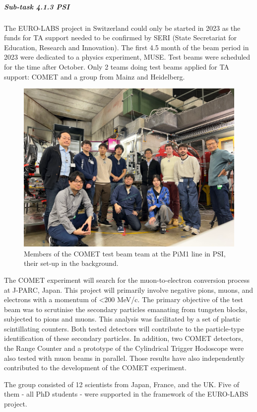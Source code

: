 \subparagraph{Sub-task 4.1.3 PSI} \mbox{}

The EURO-LABS project in Switzerland could only be started in 2023 as the funds for TA support needed to be confirmed by SERI (State Secretariat for Education, Research and Innovation). The first 4.5 month of the beam period in 2023 were dedicated to a physics experiment, MUSE. Test beams were scheduled for the time after October. Only 2 teams doing test beams applied for TA support: COMET and a group from Mainz and Heidelberg. 

\begin{figure}[!h]
    \centering
    \includegraphics[width=0.75\linewidth]{image3.png}
    \caption{Members of the COMET test beam team at the PiM1 line in PSI, their set-up in the background.  }
    \label{fig:4.1.3}
\end{figure}

The COMET experiment will search for the muon-to-electron conversion process at J-PARC, Japan. This project will primarily involve negative pions, muons, and electrons with a momentum of <200 MeV/c. The primary objective of the test beam was to scrutinise the secondary particles emanating from tungsten blocks, subjected to pions and muons. This analysis was facilitated by a set of plastic scintillating counters. Both tested detectors will contribute to the particle-type identification of these secondary particles. In addition, two COMET detectors, the Range Counter and a prototype of the Cylindrical Trigger Hodoscope were also tested with muon beams in parallel. Those results have also independently contributed to the development of the COMET experiment. 

The group consisted of 12 scientists from Japan, France, and the UK. Five of them - all PhD students - were supported in the framework of the EURO-LABS project.


